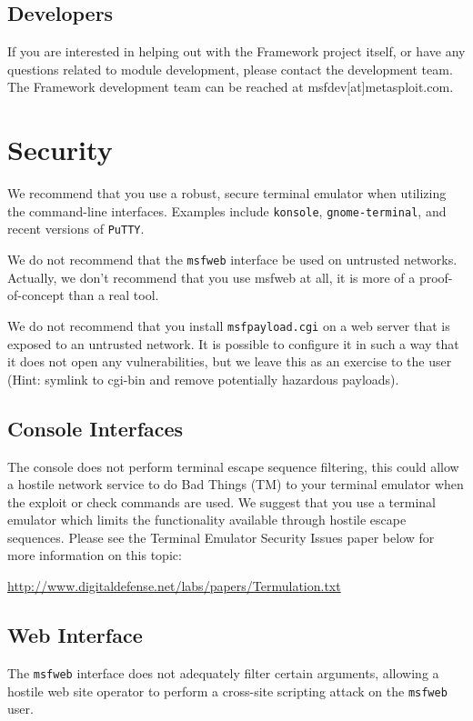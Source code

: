 \documentclass{report}
\begin{document}
\section{Developers}
\par
If you are interested in helping out with the Framework project itself, or have any
questions related to module development, please contact the development team. The
Framework development team can be reached at msfdev[at]metasploit.com.

\pagebreak
\appendix

\pagebreak
\chapter{Security}

\par
We recommend that you use a robust, secure terminal emulator when
utilizing the command-line interfaces. Examples include \texttt{konsole},
\texttt{gnome-terminal}, and recent versions of \texttt{PuTTY}.

\par
We do not recommend that the \texttt{msfweb} interface be used on untrusted
networks. Actually, we don't recommend that you use msfweb at all, it is
more of a proof-of-concept than a real tool.

\par
We do not recommend that you install \texttt{msfpayload.cgi} on a web server that
is exposed to an untrusted network. It is possible to configure it in such a
way that it does not open any vulnerabilities, but we leave this as an
exercise to the user (Hint: symlink to cgi-bin and remove potentially
hazardous payloads).


	\section{Console Interfaces}
\par
The console does not perform terminal escape sequence filtering, this
could allow a hostile network service to do Bad Things (TM) to your terminal
emulator when the exploit or check commands are used. We suggest that you
use a terminal emulator which limits the functionality available through
hostile escape sequences. Please see the Terminal Emulator Security Issues paper
below for more information on this topic:

\url{http://www.digitaldefense.net/labs/papers/Termulation.txt}


	\section{Web Interface}
\par
The \texttt{msfweb} interface does not adequately filter certain arguments,
allowing a hostile web site operator to perform a cross-site scripting
attack on the \texttt{msfweb} user.
\end{document}
